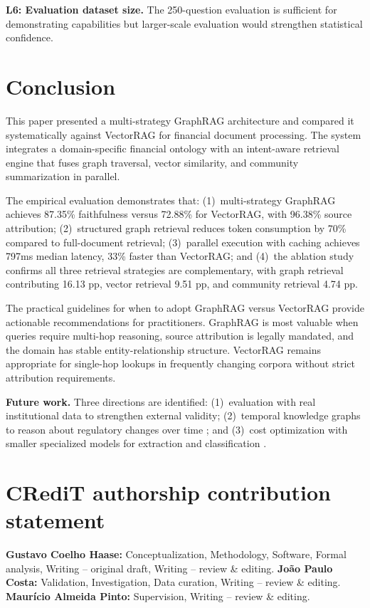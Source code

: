 \documentclass[review]{elsarticle}
\begin{document}
\textbf{L6: Evaluation dataset size.} The 250-question evaluation is sufficient for demonstrating capabilities but larger-scale evaluation would strengthen statistical confidence.


\section{Conclusion}
\label{sec:conclusion}

This paper presented a multi-strategy GraphRAG architecture and compared it systematically against VectorRAG for financial document processing. The system integrates a domain-specific financial ontology with an intent-aware retrieval engine that fuses graph traversal, vector similarity, and community summarization in parallel.

The empirical evaluation demonstrates that: (1)~multi-strategy GraphRAG achieves 87.35\% faithfulness versus 72.88\% for VectorRAG, with 96.38\% source attribution; (2)~structured graph retrieval reduces token consumption by 70\% compared to full-document retrieval; (3)~parallel execution with caching achieves 797ms median latency, 33\% faster than VectorRAG; and (4)~the ablation study confirms all three retrieval strategies are complementary, with graph retrieval contributing 16.13 pp, vector retrieval 9.51 pp, and community retrieval 4.74 pp.

The practical guidelines for when to adopt GraphRAG versus VectorRAG provide actionable recommendations for practitioners. GraphRAG is most valuable when queries require multi-hop reasoning, source attribution is legally mandated, and the domain has stable entity-relationship structure. VectorRAG remains appropriate for single-hop lookups in frequently changing corpora without strict attribution requirements.

\textbf{Future work.} Three directions are identified: (1)~evaluation with real institutional data to strengthen external validity; (2)~temporal knowledge graphs to reason about regulatory changes over time \citep{li2024findkg}; and (3)~cost optimization with smaller specialized models for extraction and classification \citep{li2025subgraphrag}.


\section*{CRediT authorship contribution statement}
\textbf{Gustavo Coelho Haase:} Conceptualization, Methodology, Software, Formal analysis, Writing -- original draft, Writing -- review \& editing.
\textbf{Jo\~{a}o Paulo Costa:} Validation, Investigation, Data curation, Writing -- review \& editing.
\textbf{Maur\'{i}cio Almeida Pinto:} Supervision, Writing -- review \& editing.
\end{document}
